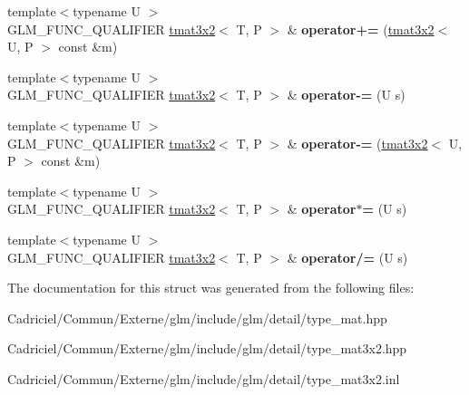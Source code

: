 \begin{DoxyCompactItemize}
\item 
{\footnotesize template$<$typename U $>$ }\\G\+L\+M\+\_\+\+F\+U\+N\+C\+\_\+\+Q\+U\+A\+L\+I\+F\+I\+ER \hyperlink{structglm_1_1detail_1_1tmat3x2}{tmat3x2}$<$ T, P $>$ \& {\bfseries operator+=} (\hyperlink{structglm_1_1detail_1_1tmat3x2}{tmat3x2}$<$ U, P $>$ const \&m)\hypertarget{structglm_1_1detail_1_1tmat3x2_aeb063f61f41be8039bf8e5b40b40ae50}{}\label{structglm_1_1detail_1_1tmat3x2_aeb063f61f41be8039bf8e5b40b40ae50}

\item 
{\footnotesize template$<$typename U $>$ }\\G\+L\+M\+\_\+\+F\+U\+N\+C\+\_\+\+Q\+U\+A\+L\+I\+F\+I\+ER \hyperlink{structglm_1_1detail_1_1tmat3x2}{tmat3x2}$<$ T, P $>$ \& {\bfseries operator-\/=} (U s)\hypertarget{structglm_1_1detail_1_1tmat3x2_af77215fb32bc46ef8b32f044ef9bdab6}{}\label{structglm_1_1detail_1_1tmat3x2_af77215fb32bc46ef8b32f044ef9bdab6}

\item 
{\footnotesize template$<$typename U $>$ }\\G\+L\+M\+\_\+\+F\+U\+N\+C\+\_\+\+Q\+U\+A\+L\+I\+F\+I\+ER \hyperlink{structglm_1_1detail_1_1tmat3x2}{tmat3x2}$<$ T, P $>$ \& {\bfseries operator-\/=} (\hyperlink{structglm_1_1detail_1_1tmat3x2}{tmat3x2}$<$ U, P $>$ const \&m)\hypertarget{structglm_1_1detail_1_1tmat3x2_a27015cfc43f110539d46ab697ce67d4b}{}\label{structglm_1_1detail_1_1tmat3x2_a27015cfc43f110539d46ab697ce67d4b}

\item 
{\footnotesize template$<$typename U $>$ }\\G\+L\+M\+\_\+\+F\+U\+N\+C\+\_\+\+Q\+U\+A\+L\+I\+F\+I\+ER \hyperlink{structglm_1_1detail_1_1tmat3x2}{tmat3x2}$<$ T, P $>$ \& {\bfseries operator$\ast$=} (U s)\hypertarget{structglm_1_1detail_1_1tmat3x2_af59d2d25557d16f13ff7fd79fa94bfd0}{}\label{structglm_1_1detail_1_1tmat3x2_af59d2d25557d16f13ff7fd79fa94bfd0}

\item 
{\footnotesize template$<$typename U $>$ }\\G\+L\+M\+\_\+\+F\+U\+N\+C\+\_\+\+Q\+U\+A\+L\+I\+F\+I\+ER \hyperlink{structglm_1_1detail_1_1tmat3x2}{tmat3x2}$<$ T, P $>$ \& {\bfseries operator/=} (U s)\hypertarget{structglm_1_1detail_1_1tmat3x2_ab8db479d66f6b4cac2c02b9e5a2e40d8}{}\label{structglm_1_1detail_1_1tmat3x2_ab8db479d66f6b4cac2c02b9e5a2e40d8}

\end{DoxyCompactItemize}


The documentation for this struct was generated from the following files\+:\begin{DoxyCompactItemize}
\item 
Cadriciel/\+Commun/\+Externe/glm/include/glm/detail/type\+\_\+mat.\+hpp\item 
Cadriciel/\+Commun/\+Externe/glm/include/glm/detail/type\+\_\+mat3x2.\+hpp\item 
Cadriciel/\+Commun/\+Externe/glm/include/glm/detail/type\+\_\+mat3x2.\+inl\end{DoxyCompactItemize}
